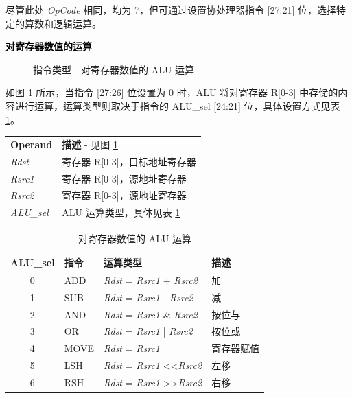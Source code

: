 \documentclass[main\_\_CN.tex]{subfiles}
\begin{document}
尽管此处 \textit{OpCode} 相同，均为 7，但可通过设置协处理器指令 [27:21] 位，选择特定的算数和逻辑运算。

\textcolor{black}{\bfseries 对寄存器数值的运算}

%
%
%
%
%
%
%
%
\begin{figure}[!ht]
    \centering
    \caption{指令类型 - 对寄存器数值的 ALU 运算}
    \label{figure:ALU-among-registers}
\end{figure}

如图 \ref{figure:ALU-among-registers} 所示，当指令 [27:26] 位设置为 0 时，ALU 将对寄存器 R[0-3] 中存储的内容进行运算，运算类型则取决于指令的 ALU\_sel [24:21] 位，具体设置方式见表 \ref{table:ALU-among-registers}。

\begin{tabular}{ l l }
\textbf{Operand} & \textbf{描述} - 见图 \ref{figure:ALU-among-registers} \\
\textit{Rdst} & 寄存器 R[0-3]，目标地址寄存器\\
\textit{Rsrc1} & 寄存器 R[0-3]，源地址寄存器 \\
\textit{Rsrc2} & 寄存器 R[0-3]，源地址寄存器 \\
\textit{ALU\_sel} & ALU 运算类型，具体见表 \ref{table:ALU-among-registers}\\
\end{tabular}

\begin{table}[!ht]
    \centering
    \begin{tabular}{ c l l l }
    \textbf{ALU\_sel} & \textbf{指令} & \textbf{运算类型} & \textbf{描述} \\ \hline
    0 & ADD & \textit{Rdst} = \textit{Rsrc1} + \textit{Rsrc2} & 加 \\
    1 & SUB & \textit{Rdst} = \textit{Rsrc1} - \textit{Rsrc2} & 减 \\
    2 & AND & \textit{Rdst} = \textit{Rsrc1} \& \textit{Rsrc2} & 按位与 \\
    3 & OR & \textit{Rdst} = \textit{Rsrc1} | \textit{Rsrc2} & 按位或 \\
    4 & MOVE & \textit{Rdst} = \textit{Rsrc1} & 寄存器赋值 \\
    5 & LSH & \textit{Rdst} = \textit{Rsrc1} \textless\textless\textvisiblespace \textit{Rsrc2} & 左移 \\
    6 & RSH & \textit{Rdst} = \textit{Rsrc1} \textgreater\textgreater\textvisiblespace \textit{Rsrc2} & 右移 \\
    \end{tabular}
    \caption{对寄存器数值的 ALU 运算}
    \label{table:ALU-among-registers}
\end{table}
\end{document}
